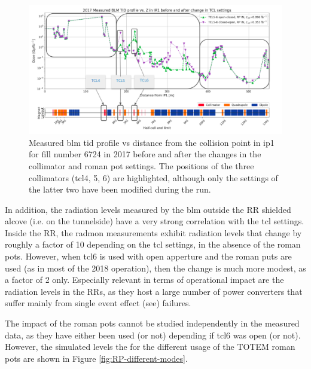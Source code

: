 \documentclass[encoding=utf8,british]{tumphthesis}
\begin{document}
\begin{figure}[H]
    \centering
    \includegraphics[width=1.0\linewidth]{results/mixed_modes_2017.png}
    \caption{Measured \acrshort{blm} \acrshort{tid} profile vs distance from the collision point in \acrshort{ip}1 for fill number 6724 in 2017 before and after the changes in the collimator and roman pot settings. The positions of the three collimators (\acrshort{tcl}4, 5, 6) are highlighted, although only the settings of the latter two have been modified during the run.}
    \label{fig:TCL-different-modes}
\end{figure}



In addition, the radiation levels measured by the \acrshort{blm} outside the RR shielded alcove (i.e. on the tunnelside) have a very strong correlation with the \acrshort{tcl} settings. Inside the RR, the \acrshort{radmon}  measurements exhibit radiation  levels that change by roughly a factor of 10 depending on the \acrshort{tcl} settings, in the absence of the roman pots. However, when \acrshort{tcl}6 is used with open apperture and the roman puts are used (as in most of the 2018 operation), then the change is much more modest, as a factor of 2 only. Especially  relevant  in  terms  of  operational  impact are the radiation levels in the RRs, as they host a large number of power converters that suffer mainly from single event effect (\acrshort{see}) failures. 


The impact of the roman pots cannot be studied independently in the measured data, as they have either been used (or not) depending if \acrshort{tcl}6 was open (or not). However, the simulated levels the for the different usage of the TOTEM roman pots are shown in Figure \ref{fig:RP-different-modes}.
\end{document}
